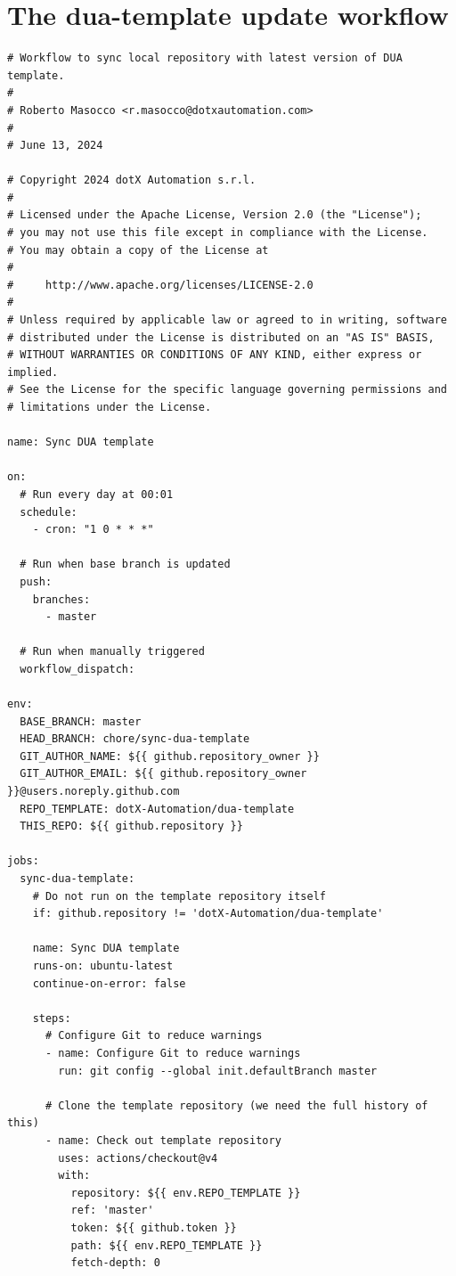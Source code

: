 \chapter{The dua-template update workflow}
\label{app:workflow}
\vspace{-1cm}

\begin{center}
\begin{lstlisting}[caption={\texttt{dua-template} update GitHub workflow as of November 22, 2024 \cite{masocco_dua-template_nodate}.}, label={lst:duawf}]
# Workflow to sync local repository with latest version of DUA template.
#
# Roberto Masocco <r.masocco@dotxautomation.com>
#
# June 13, 2024

# Copyright 2024 dotX Automation s.r.l.
#
# Licensed under the Apache License, Version 2.0 (the "License");
# you may not use this file except in compliance with the License.
# You may obtain a copy of the License at
#
#     http://www.apache.org/licenses/LICENSE-2.0
#
# Unless required by applicable law or agreed to in writing, software
# distributed under the License is distributed on an "AS IS" BASIS,
# WITHOUT WARRANTIES OR CONDITIONS OF ANY KIND, either express or implied.
# See the License for the specific language governing permissions and
# limitations under the License.

name: Sync DUA template

on:
  # Run every day at 00:01
  schedule:
    - cron: "1 0 * * *"

  # Run when base branch is updated
  push:
    branches:
      - master

  # Run when manually triggered
  workflow_dispatch:

env:
  BASE_BRANCH: master
  HEAD_BRANCH: chore/sync-dua-template
  GIT_AUTHOR_NAME: ${{ github.repository_owner }}
  GIT_AUTHOR_EMAIL: ${{ github.repository_owner }}@users.noreply.github.com
  REPO_TEMPLATE: dotX-Automation/dua-template
  THIS_REPO: ${{ github.repository }}

jobs:
  sync-dua-template:
    # Do not run on the template repository itself
    if: github.repository != 'dotX-Automation/dua-template'

    name: Sync DUA template
    runs-on: ubuntu-latest
    continue-on-error: false

    steps:
      # Configure Git to reduce warnings
      - name: Configure Git to reduce warnings
        run: git config --global init.defaultBranch master

      # Clone the template repository (we need the full history of this)
      - name: Check out template repository
        uses: actions/checkout@v4
        with:
          repository: ${{ env.REPO_TEMPLATE }}
          ref: 'master'
          token: ${{ github.token }}
          path: ${{ env.REPO_TEMPLATE }}
          fetch-depth: 0


\end{lstlisting}
\end{center}
